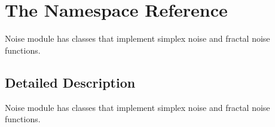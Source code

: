 \hypertarget{namespace_the}{}\section{The Namespace Reference}
\label{namespace_the}


Noise module has classes that implement simplex noise and fractal noise functions.  




\subsection{Detailed Description}
Noise module has classes that implement simplex noise and fractal noise functions. 